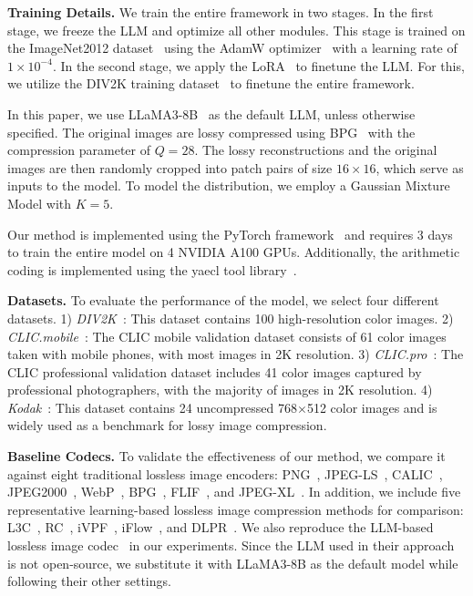 \textbf{Training Details.}
We train the entire framework in two stages. In the first stage, we freeze the LLM and optimize all other modules. This stage is trained on the ImageNet2012 dataset~\cite{ILSVRC15} using the AdamW optimizer~\cite{loshchilov2017decoupled} with a learning rate of $1 \times 10^{-4}$. In the second stage, we apply the LoRA~\cite{hu2021lora} to finetune the LLM. For this, we utilize the DIV2K training dataset~\cite{Ignatov_2018_ECCV_Workshops} to finetune the entire framework.

In this paper, we use LLaMA3-8B~\cite{dubey2024llama} as the default LLM, unless otherwise specified. The original images are lossy compressed using BPG~\cite{bpg} with the compression parameter of $Q = 28$. The lossy reconstructions and the original images are then randomly cropped into patch pairs of size $16 \times 16$, which serve as inputs to the model. To model the distribution, we employ a Gaussian Mixture Model with $K=5$.

Our method is implemented using the PyTorch framework~\cite{paszke2017automatic} and requires 3 days to train the entire model on 4 NVIDIA A100 GPUs. 
Additionally, the arithmetic coding is implemented using the yaecl tool library~\cite{xu2022bit}. 

\textbf{Datasets.}
To evaluate the performance of the model, we select four different datasets. 1) \textit{DIV2K}~\cite{Ignatov_2018_ECCV_Workshops}: This dataset contains 100 high-resolution color images.
2) \textit{CLIC.mobile}~\cite{CLIC2020}:  The CLIC mobile validation dataset consists of 61 color images taken with mobile phones, with most images in 2K resolution.
3) \textit{CLIC.pro}~\cite{CLIC2020}: The CLIC professional validation dataset includes 41 color images captured by professional photographers, with the majority of images in 2K resolution.
4) \textit{Kodak}~\cite{kodak1993kodak}: This dataset contains 24 uncompressed 768$\times$512 color images and is widely used as a benchmark for lossy image compression.


\textbf{Baseline Codecs.}
To validate the effectiveness of our method, we compare it against eight traditional lossless image encoders: PNG~\cite{boutell1997png}, JPEG-LS~\cite{weinberger2000loco}, CALIC~\cite{wu1997context}, JPEG2000~\cite{skodras2001jpeg}, WebP~\cite{webp_tech_report}, BPG~\cite{bpg}, FLIF~\cite{sneyers2016flif}, and JPEG-XL~\cite{alakuijala2019jpeg}. In addition, we include five representative learning-based lossless image compression methods for comparison: L3C~\cite{mentzer2019practical}, RC~\cite{mentzer2020learning}, iVPF~\cite{zhang2021ivpf}, iFlow~\cite{zhang2021iflow}, and DLPR~\cite{bai2024deep}. We also reproduce the LLM-based lossless image codec~\cite{deletang2023language} in our experiments. Since the LLM 
 used in their approach is not open-source, we substitute it with LLaMA3-8B as the default model while following their other settings. 

